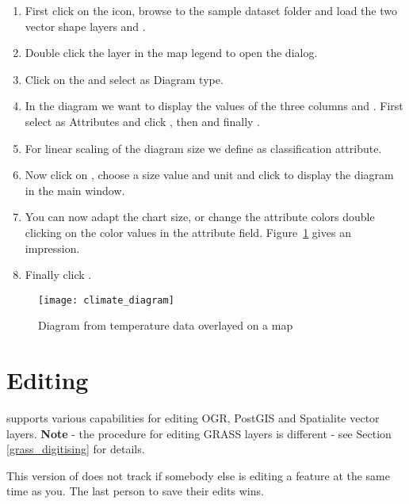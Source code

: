 \begin{enumerate}
\item First click on the  icon,
browse to the \qg sample dataset folder and load the two vector shape layers
 and .
\item Double click the  layer in the map legend to open the
 dialog.
\item Click on the  and select  as
Diagram type.
\item In the diagram we want to display the values of the three columns
 and . First select
 as Attributes and click , then
 and finally .
\item For linear scaling of the diagram size we define 
as classification attribute.
\item Now click on , choose a size value and unit
and click  to display the diagram in the \qg main window.
\item You can now adapt the chart size, or change the attribute colors double
clicking on the color values in the attribute field.
Figure~\ref{fig:climatediagram} gives an impression.
\item Finally click .
\end{enumerate}

\begin{figure}[ht]
   \centering
   \texttt{[image: climate\_diagram]}
   \caption{Diagram from temperature data overlayed on a map \nixcaption}\label{fig:climatediagram}
\end{figure}

\section{Editing}

\qg supports various capabilities for editing OGR, PostGIS and Spatialite
vector layers. \textbf{Note} - the procedure for editing GRASS layers is
different - see Section \ref{grass_digitising} for details.

\begin{Tip}\caption{\textsc{Concurrent Edits}}
This version of \qg does not track if somebody else is editing a
feature at the same time as you. The last person to save their edits wins.
\end{Tip}

